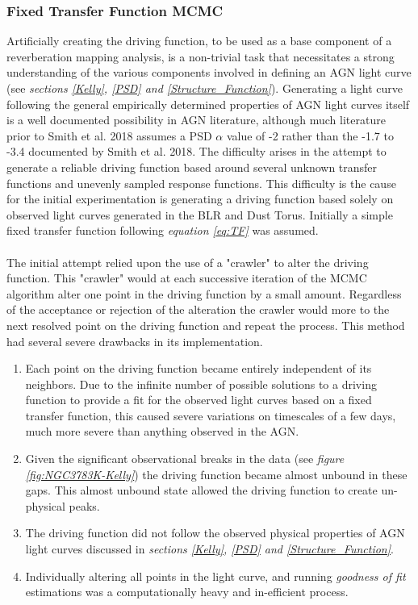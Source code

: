 \documentclass[a4paper, 12pt, twoside]{article}
\begin{document}
\subsubsection{Fixed Transfer Function MCMC}
Artificially creating the driving function, to be used as a base component of a reverberation mapping analysis, is a non-trivial task that necessitates a strong understanding of the various components involved in defining an AGN light curve (see \emph{sections \ref{Kelly}, \ref{PSD} and \ref{Structure_Function}}). Generating a light curve following the general empirically determined properties of AGN light curves itself is a well documented possibility in AGN literature, although much literature prior to Smith et al. 2018 assumes a PSD $\alpha$ value of -2 rather than the -1.7 to -3.4 documented by Smith et al. 2018. The difficulty arises in the attempt to generate a reliable driving function based around several unknown transfer functions and unevenly sampled response functions. This difficulty is the cause for the initial experimentation is generating a driving function based solely on observed light curves generated in the BLR and Dust Torus. Initially a simple fixed transfer function following \emph{equation \ref{eq:TF}} was assumed. \\
\\
The initial attempt relied upon the use of a "crawler" to alter the driving function. This "crawler" would at each successive iteration of the MCMC algorithm alter one point in the driving function by a small amount. Regardless of the acceptance or rejection of the alteration the crawler would more to the next resolved point on the driving function and repeat the process. This method had several severe drawbacks in its implementation. 
\begin{enumerate}
\item Each point on the driving function became entirely independent of its neighbors. Due to the infinite number of possible solutions to a driving function to provide a fit for the observed light curves based on a fixed transfer function, this caused severe variations on timescales of a few days, much more severe than anything observed in the AGN.
\item Given the significant observational breaks in the data (see \emph{figure \ref{fig:NGC3783K-Kelly}}) the driving function became almost unbound in these gaps. This almost unbound state allowed the driving function to create un-physical peaks.
\item The driving function did not follow the observed physical properties of AGN light curves discussed in \emph{sections \ref{Kelly}, \ref{PSD} and \ref{Structure_Function}}.
\item Individually altering all points in the light curve, and running \emph{goodness of fit} estimations was a computationally heavy and in-efficient process.
\end{enumerate}
\end{document}
